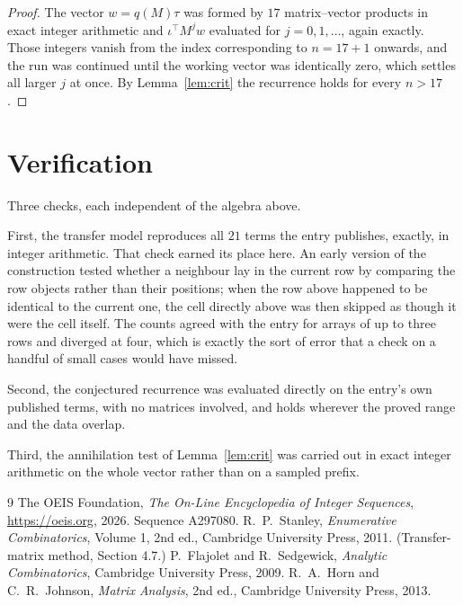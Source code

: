 \documentclass[11pt,a4paper]{article}
\theoremstyle{plain}
\theoremstyle{definition}
\begin{document}
\begin{proof}
The vector $w=q(M)\tau$ was formed by $17$ matrix--vector products in exact integer
arithmetic and $\iota^{\!\top}M^{j}w$ evaluated for $j=0,1,\dots$, again exactly. Those
integers vanish from the index corresponding to $n=17+1$ onwards, and the run was
continued until the working vector was identically zero, which settles all larger $j$ at once.
By Lemma~\ref{lem:crit} the recurrence holds for every $n>17$.
\end{proof}

\section{Verification}

Three checks, each independent of the algebra above.

First, the transfer model reproduces all $21$ terms the entry publishes, exactly, in
integer arithmetic. That check earned its place here. An early version of the construction
tested whether a neighbour lay in the current row by comparing the row objects rather
than their positions; when the row above happened to be identical to the current one, the
cell directly above was then skipped as though it were the cell itself. The counts agreed with
the entry for arrays of up to three rows and diverged at four, which is exactly the sort of
error that a check on a handful of small cases would have missed.

Second, the conjectured recurrence was evaluated directly on the entry's own published terms,
with no matrices involved, and holds wherever the proved range and the data overlap.

Third, the annihilation test of Lemma~\ref{lem:crit} was carried out in exact integer
arithmetic on the whole vector rather than on a sampled prefix.

\begin{thebibliography}{9}
 The OEIS Foundation, \emph{The On-Line Encyclopedia of Integer
Sequences}, \url{https://oeis.org}, 2026. Sequence A297080.
 R.~P.~Stanley, \emph{Enumerative Combinatorics}, Volume 1, 2nd ed.,
Cambridge University Press, 2011. (Transfer-matrix method, Section 4.7.)
 P.~Flajolet and R.~Sedgewick, \emph{Analytic Combinatorics}, Cambridge
University Press, 2009.
 R.~A.~Horn and C.~R.~Johnson, \emph{Matrix Analysis}, 2nd ed., Cambridge
University Press, 2013.
\end{thebibliography}
\end{document}
